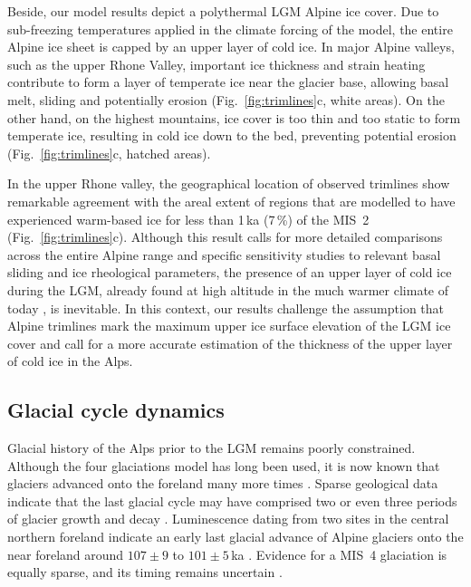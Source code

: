 \documentclass[tc, manuscript]{copernicus}
\begin{document}
    Beside, our model results depict a polythermal LGM Alpine ice cover.
    Due to sub-freezing temperatures applied in the climate forcing of the
    model, the entire Alpine ice sheet is capped by an upper layer of cold ice.
    In major Alpine valleys, such as the upper Rhone Valley, important ice
    thickness and strain heating contribute to form a layer of temperate ice
    near the glacier base, allowing basal melt, sliding and potentially
    erosion (Fig.~\ref{fig:trimlines}c, white areas). On the other hand, on the
    highest mountains, ice cover is too thin and too static to form temperate
    ice, resulting in cold ice down to the bed, preventing potential erosion
    (Fig.~\ref{fig:trimlines}c, hatched areas).

    In the upper Rhone valley, the geographical location of observed trimlines
    show remarkable agreement with the areal extent of regions that are
    modelled to have experienced warm-based ice for less than 1\,ka (7\,\%) of the
    MIS~2 (Fig.~\ref{fig:trimlines}c). Although this result calls for more
    detailed comparisons across the
    entire Alpine range and specific sensitivity studies to relevant basal
    sliding and ice rheological parameters, the presence of an upper layer of
    cold ice during the LGM, already found at high altitude in the much warmer
    climate of today \citep[e.g.,][]{Suter.etal.2001, Bohleber.etal.2017}, is
    inevitable. In this context, our results challenge the assumption that
    Alpine trimlines mark the maximum upper ice surface elevation of the LGM
    ice cover and call for a more accurate estimation of the thickness of the
    upper layer of cold ice in the Alps.


\subsection{Glacial cycle dynamics}
\label{sec:glaciations}

    Glacial history of the Alps prior to the LGM remains poorly constrained.
    Although the four glaciations model \citep{Penck.Bruckner.1909} has long
    been used, it is now known that glaciers advanced onto the foreland many
    more times \citep{Schluchter.1991, Preusser.etal.2011}. Sparse geological
    data indicate that the last glacial cycle may have comprised two or even
    three periods of glacier growth and decay \citep{Preusser.2004,Ivy-Ochs.etal.2008}.
    Luminescence dating from two sites in the central northern foreland
    indicate an early last glacial advance of Alpine glaciers onto the near
    foreland around $107\pm9$ to $101\pm5$\,ka \citep{Preusser.etal.2003,
    Preusser.Schluchter.2004}. Evidence for a MIS~4 glaciation is equally
    sparse, and its timing remains uncertain
    \citep[e.g.,][]{Preusser.etal.2007, Link.Preusser.2006}.
\end{document}
